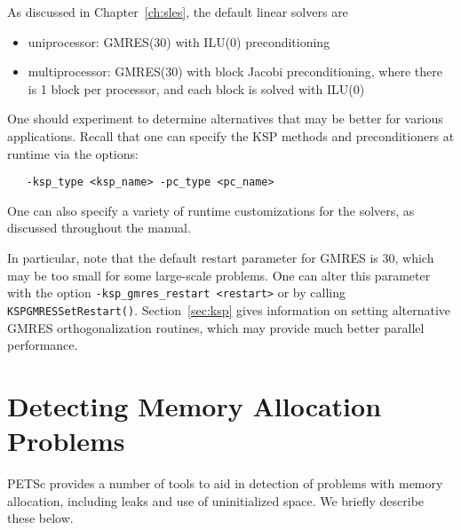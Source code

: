As discussed in Chapter~\ref{ch:sles}, the default linear solvers are
\begin{itemize}
\item uniprocessor: GMRES(30) with ILU(0) preconditioning\\
\item multiprocessor: GMRES(30) with block Jacobi preconditioning, where there
                     is 1 block per processor, and each block is solved with ILU(0)\\
\end{itemize}
One should experiment to determine alternatives that may be better for
various applications.  Recall that one can specify the KSP methods and
preconditioners at runtime via the options:
\begin{verbatim}
   -ksp_type <ksp_name> -pc_type <pc_name>
\end{verbatim}
One can also specify a variety of runtime customizations for the
solvers, as discussed throughout the manual.

In particular, note that the default restart parameter for GMRES is
30, which may be too small for some large-scale problems.  One can alter this
parameter with the option {\tt -ksp\_gmres\_restart <restart>} or by
calling {\tt KSPGMRESSetRestart()}. Section~\ref{sec:ksp} gives
information on setting alternative GMRES orthogonalization routines,
which may provide much better parallel performance.

\section{Detecting Memory Allocation Problems}

PETSc provides a number of tools to aid in detection of problems
with memory allocation, including leaks and use of uninitialized space.
We briefly describe these below.
 

